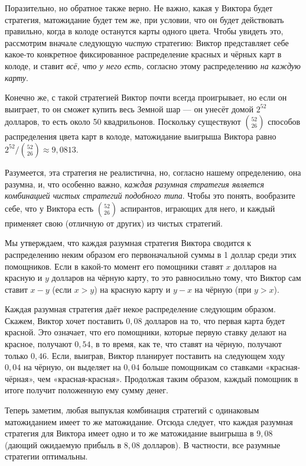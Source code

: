 Поразительно, но обратное также верно.
Не важно, какая у Виктора будет стратегия, матожидание будет тем же, при условии, что он будет действовать правильно, когда в колоде останутся карты одного цвета.
Чтобы увидеть это, рассмотрим вначале следующую \emph{чистую} стратегию: Виктор представляет себе какое-то конкретное фиксированное распределение красных и чёрных карт в колоде, и ставит \emph{всё, что у него есть,} согласно этому распределению \emph{на каждую карту}.

Конечно же, с такой стратегией Виктор почти всегда проигрывает, но если он выиграет, то он сможет купить весь Земной шар --- он унесёт домой $2^{52}$ долларов, то есть около 50 квадрильонов.
Поскольку существуют $\binom{52}{26}$ способов распределения цвета карт в колоде, матожидание выигрыша Виктора равно $2^{52}/\binom{52}{26} \approx 9{,}0813$.

Разумеется, эта стратегия не реалистична, но, согласно нашему определению, она разумна, и, что особенно важно, \emph{каждая разумная стратегия является комбинацией чистых стратегий подобного типа}.
Чтобы это понять, вообразите себе, что у Виктора есть $\binom{52}{26}$ аспирантов, играющих для него, и каждый применяет свою (отличную от других) из чистых стратегий.

Мы утверждаем, что каждая разумная стратегия Виктора сводится к распределению неким образом его первоначальной суммы в 1 доллар среди этих помощников.
Если в какой-то момент его помощники ставят $x$ долларов на красную и $y$ долларов на чёрную карту, то это равносильно тому, что Виктор сам ставит $x-y$ (если $x > y$) на красную карту и $y-x$ на чёрную (при $y>x$).

Каждая разумная стратегия даёт некое распределение следующим образом.
Скажем, Виктор хочет поставить $0{,}08$ долларов на то, что первая карта будет красной.
Это означает, что его помощники, которые первую ставку делают на красное, получают $0{,}54$, в то время, как те, что ставят на чёрную, получают только $0{,}46$.
Если, выиграв, Виктор планирует поставить на следующем ходу $0{,}04$ на чёрную, он выделяет на $0{,}04$ больше помощникам со ставками «красная-чёрная», чем «красная-красная».
Продолжая таким образом, каждый помощник в итоге получит положенную ему сумму денег.

Теперь заметим, любая выпуклая комбинация стратегий с одинаковым матожиданием имеет то же матожидание.
Отсюда следует, что каждая разумная стратегия для Виктора имеет одно и то же матожидание выигрыша в $9{,}08$ (дающий ожидаемую прибыль в $8{,}08$ долларов).
В частности, все разумные стратегии оптимальны.

